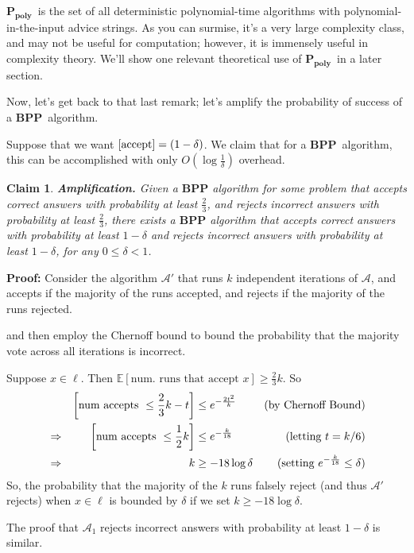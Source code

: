 \documentclass[11pt]{article}
\let\Pr\relax
\DeclareMathOperator*{\Pr}{\mathbb{P}}
\newcommand{\BPP}{\ensuremath{\mathbf{BPP}}}
\newcommand{\Ppoly}{\ensuremath{\mathbf{P_{poly}}}}
\newcommand{\Alg}{\ensuremath{\mathcal{A}}}
\newtheorem{claim}[theorem]{Claim}
\begin{document}
\Ppoly\ is the set of all deterministic polynomial-time algorithms with polynomial-in-the-input advice strings. As you can surmise, it's a very large complexity class, and may not be useful for computation; however, it is immensely useful in complexity theory.
We'll show one relevant theoretical use of \Ppoly\ in a later section.

Now, let's get back to that last remark; let's amplify the probability of success of a \BPP\ algorithm.

Suppose that we want $\Pr[\text{accept}] = (1-\delta)$. We claim that for a \BPP\ algorithm, this can be accomplished with only $O(\log{\frac{1}{\delta}})$ overhead.

\begin{claim}
\textbf{Amplification.} Given a $\BPP$ algorithm for some problem that accepts correct answers with probability at least $\frac23$, and rejects incorrect answers with probability at least $\frac23$, there exists a $\BPP$ algorithm that accepts correct answers with probability at least $1 - \delta$ and rejects incorrect answers with probability at least $1 - \delta$, for any $0 \le \delta < 1$.

\end{claim}
\textbf{Proof:} Consider the algorithm $\Alg'$ that runs $k$ independent iterations of $\Alg$, and accepts if the majority of the runs accepted, and rejects if the majority of the runs rejected.

and then employ the Chernoff bound to bound the probability that the majority vote across all iterations is incorrect.

Suppose $x\in\ell$. Then $\mathbb{E}[\text{num. runs that accept } x] \geq \frac{2}{3}k$.
So
\begin{align*}
  &&\Pr\left[\text{num accepts }\leq \frac{2}{3}k - t\right] &\leq e^{-{\frac{2t^2}{k}}} &\text{(by Chernoff Bound)} \\
  &\Rightarrow&
  \Pr\left[\text{num accepts }\leq \frac12k\right] &\leq e^{-{\frac{k}{18}}} &\text{(letting $t = k/6$)} \\
  &\Rightarrow &
  k &\ge -18\log \delta &\text{(setting $e^{-\frac{k}{18}} \le \delta$)}
\end{align*}
So, the probability that the majority of the $k$ runs falsely reject (and thus $\Alg'$ rejects) when $x \in \ell$ is bounded by $\delta$ if we set $k \ge -18 \log \delta$.

The proof that $\Alg_1$ rejects incorrect answers with probability at least $1 - \delta$ is similar.
\end{document}
